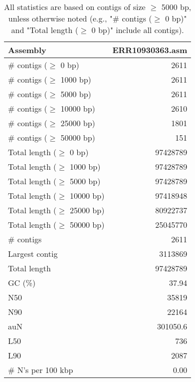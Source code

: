 \documentclass[12pt,a4paper]{article}
\begin{document}
\begin{table}[ht]
\begin{center}
\caption{All statistics are based on contigs of size $\geq$ 5000 bp, unless otherwise noted (e.g., "\# contigs ($\geq$ 0 bp)" and "Total length ($\geq$ 0 bp)" include all contigs).}
\begin{tabular}{|l*{1}{|r}|}
\hline
Assembly & ERR10930363.asm \\ \hline
\# contigs ($\geq$ 0 bp) & 2611 \\ \hline
\# contigs ($\geq$ 1000 bp) & 2611 \\ \hline
\# contigs ($\geq$ 5000 bp) & 2611 \\ \hline
\# contigs ($\geq$ 10000 bp) & 2610 \\ \hline
\# contigs ($\geq$ 25000 bp) & 1801 \\ \hline
\# contigs ($\geq$ 50000 bp) & 151 \\ \hline
Total length ($\geq$ 0 bp) & 97428789 \\ \hline
Total length ($\geq$ 1000 bp) & 97428789 \\ \hline
Total length ($\geq$ 5000 bp) & 97428789 \\ \hline
Total length ($\geq$ 10000 bp) & 97418948 \\ \hline
Total length ($\geq$ 25000 bp) & 80922737 \\ \hline
Total length ($\geq$ 50000 bp) & 25045770 \\ \hline
\# contigs & 2611 \\ \hline
Largest contig & 3113869 \\ \hline
Total length & 97428789 \\ \hline
GC (\%) & 37.94 \\ \hline
N50 & 35819 \\ \hline
N90 & 22164 \\ \hline
auN & 301050.6 \\ \hline
L50 & 736 \\ \hline
L90 & 2087 \\ \hline
\# N's per 100 kbp & 0.00 \\ \hline
\end{tabular}
\end{center}
\end{table}
\end{document}
